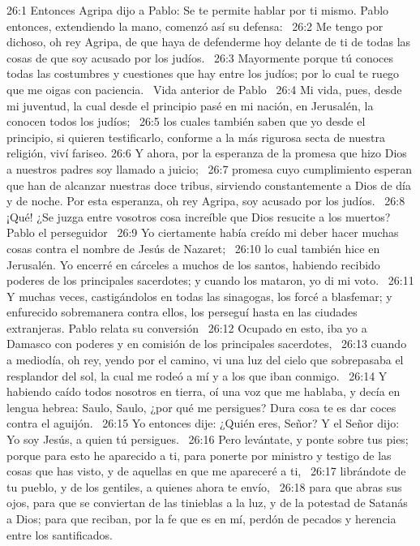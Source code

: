 26:1 Entonces Agripa dijo a Pablo: Se te permite hablar por ti mismo. Pablo entonces, extendiendo la mano, comenzó así su defensa:  
26:2 Me tengo por dichoso, oh rey Agripa, de que haya de defenderme hoy delante de ti de todas las cosas de que soy acusado por los judíos.  
26:3 Mayormente porque tú conoces todas las costumbres y cuestiones que hay entre los judíos; por lo cual te ruego que me oigas con paciencia.  
Vida anterior de Pablo  
26:4 Mi vida, pues, desde mi juventud, la cual desde el principio pasé en mi nación, en Jerusalén, la conocen todos los judíos;  
26:5 los cuales también saben que yo desde el principio, si quieren testificarlo, conforme a la más rigurosa secta de nuestra religión, viví fariseo. 
26:6 Y ahora, por la esperanza de la promesa que hizo Dios a nuestros padres soy llamado a juicio;  
26:7 promesa cuyo cumplimiento esperan que han de alcanzar nuestras doce tribus, sirviendo constantemente a Dios de día y de noche. Por esta esperanza, oh rey Agripa, soy acusado por los judíos.  
26:8 ¡Qué! ¿Se juzga entre vosotros cosa increíble que Dios resucite a los muertos?  
Pablo el perseguidor  
26:9 Yo ciertamente había creído mi deber hacer muchas cosas contra el nombre de Jesús de Nazaret;  
26:10 lo cual también hice en Jerusalén. Yo encerré en cárceles a muchos de los santos, habiendo recibido poderes de los principales sacerdotes; y cuando los mataron, yo di mi voto.  
26:11 Y muchas veces, castigándolos en todas las sinagogas, los forcé a blasfemar; y enfurecido sobremanera contra ellos, los perseguí hasta en las ciudades extranjeras. 
Pablo relata su conversión   
26:12 Ocupado en esto, iba yo a Damasco con poderes y en comisión de los principales sacerdotes,  
26:13 cuando a mediodía, oh rey, yendo por el camino, vi una luz del cielo que sobrepasaba el resplandor del sol, la cual me rodeó a mí y a los que iban conmigo.  
26:14 Y habiendo caído todos nosotros en tierra, oí una voz que me hablaba, y decía en lengua hebrea: Saulo, Saulo, ¿por qué me persigues? Dura cosa te es dar coces contra el aguijón.  
26:15 Yo entonces dije: ¿Quién eres, Señor? Y el Señor dijo: Yo soy Jesús, a quien tú persigues.  
26:16 Pero levántate, y ponte sobre tus pies; porque para esto he aparecido a ti, para ponerte por ministro y testigo de las cosas que has visto, y de aquellas en que me apareceré a ti,  
26:17 librándote de tu pueblo, y de los gentiles, a quienes ahora te envío,  
26:18 para que abras sus ojos, para que se conviertan de las tinieblas a la luz, y de la potestad de Satanás a Dios; para que reciban, por la fe que es en mí, perdón de pecados y herencia entre los santificados. 
